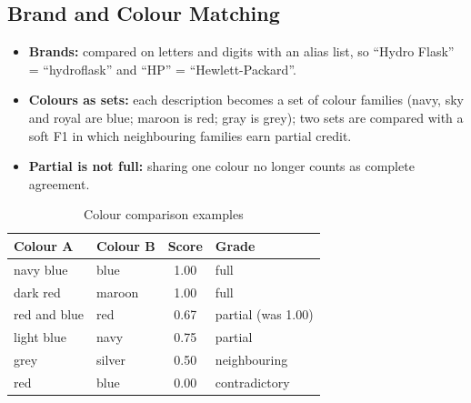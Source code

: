 \documentclass[12pt,a4paper,oneside]{report}
\begin{document}
\subsection{Brand and Colour Matching}\label{sec:attr}
\begin{itemize}
  \item \textbf{Brands:} compared on letters and digits with an alias list, so ``Hydro Flask'' = ``hydroflask'' and ``HP'' = ``Hewlett-Packard''.
  \item \textbf{Colours as sets:} each description becomes a set of colour families (navy, sky and royal are blue; maroon is red; gray is grey); two sets are compared with a soft F1 in which neighbouring families earn partial credit.
  \item \textbf{Partial is not full:} sharing one colour no longer counts as complete agreement.
\end{itemize}
\begin{table}[H]
\centering\small
\caption{Colour comparison examples}
\begin{tabularx}{\textwidth}{X X c l}
\toprule
Colour A & Colour B & Score & Grade\\
\midrule
navy blue & blue & 1.00 & full\\
dark red & maroon & 1.00 & full\\
red and blue & red & 0.67 & partial (was 1.00)\\
light blue & navy & 0.75 & partial\\
grey & silver & 0.50 & neighbouring\\
red & blue & 0.00 & contradictory\\
\bottomrule
\end{tabularx}
\end{table}
\end{document}
